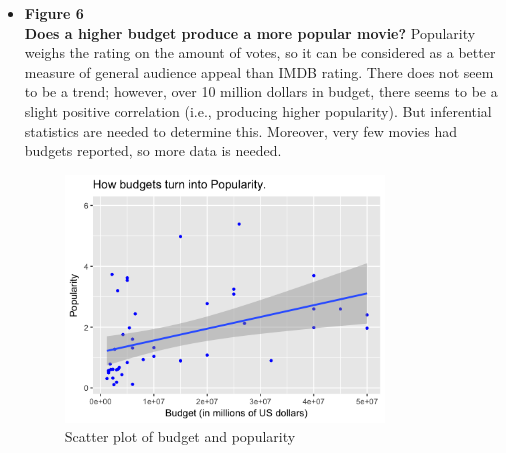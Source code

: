 \documentclass[a4paper]{article}
\begin{document}
\begin{itemize}
		
		\item \textbf{Figure 6}\\
		 \textbf{Does a higher budget produce a more popular movie?}
		 Popularity weighs the rating on the amount of votes, so it can be considered as a better measure of general audience appeal than IMDB rating. There does not seem to be a trend; however, over 10 million dollars in budget, there seems to be a slight positive correlation (i.e., producing higher popularity). But inferential statistics are needed to determine this. Moreover, very few movies had budgets reported, so more data is needed.
		\begin{figure}[h]
		\begin{center}
		\includegraphics[width=0.8\textwidth]{fig_6_budget_popularity}
		\caption{Scatter plot of budget and popularity}
		\label{fig:f6}
		\end{center}
		\end{figure}      
		

\end{itemize}
\end{document}
